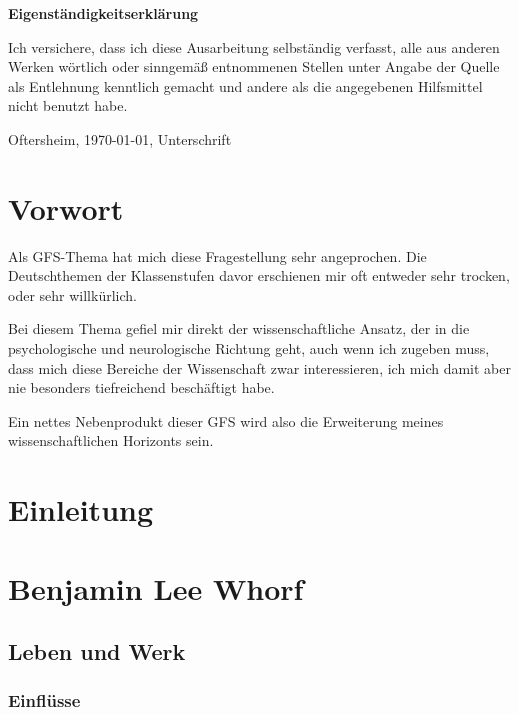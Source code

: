 \documentclass[12pt]{scrreprt}
\begin{document}
\makeititle
\begin{center}
	\sffamily\bfseries{Eigenständigkeitserklärung}
\end{center}
Ich versichere, dass ich diese Ausarbeitung selbständig verfasst, alle aus anderen Werken
wörtlich oder sinngemäß entnommenen Stellen unter Angabe der Quelle als Entlehnung
kenntlich gemacht und andere als die angegebenen Hilfsmittel nicht benutzt habe.

Oftersheim, \today, Unterschrift
\tableofcontents
\listoffigures
\listoftables
\chapter{Vorwort}
	\label{chap:vorwort}
\bigskip\newline
Als GFS-Thema hat mich diese Fragestellung sehr angeprochen.
Die Deutschthemen der Klassenstufen davor erschienen mir oft entweder sehr
trocken, oder sehr willkürlich.

Bei diesem Thema gefiel mir direkt der wissenschaftliche Ansatz, der in die
psychologische und neurologische Richtung geht, auch wenn ich zugeben muss, dass
mich diese Bereiche der Wissenschaft zwar interessieren, ich mich damit aber nie
besonders tiefreichend beschäftigt habe.

Ein nettes Nebenprodukt dieser GFS wird also die Erweiterung meines
wissenschaftlichen Horizonts sein.

\chapter{Einleitung}
\label{chap:einleitung}

\chapter{Benjamin Lee Whorf}
\label{chap:bjwhorf}
	\section{Leben und Werk}
	\label{sec:lebenuwerk}
		\subsection{Einflüsse}
		\label{sec:einflüsse}
\end{document}
